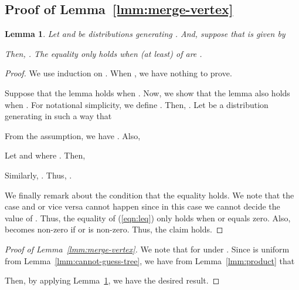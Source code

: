 \documentclass[letterpaper,11pt]{article}
\newtheorem{lemma}[theorem]{Lemma}
\begin{document}
\subsection{Proof of Lemma~\ref{lmm:merge-vertex}}\label{apx:merge-vertex}
\begin{lemma}\label{lmm:product-tv}
  Let  and  be distributions generating .
  And, suppose that  is given by
  
  Then, .
  The equality only holds when (at least)  of  are .
\end{lemma}
\begin{proof}
  We use induction on .
  When , we have nothing to prove.

  Suppose that the lemma holds when .
  Now, we show that the lemma also holds when .
  For notational simplicity,
  we define .
  Then, .
  Let  be a distribution generating  in such a way that
  
  From the assumption, we have .
  Also,
  
  Let  and  where .
  Then, 
  
  Similarly, .
  Thus, 
  .
  
  We finally remark about the condition that the equality holds.
  We note that the case  and  or vice versa cannot happen since in this case we cannot decide the value of .
  Thus, the equality of (\ref{eqn:leq}) only holds when  or  equals zero.
  Also,  becomes non-zero if  or  is non-zero.
  Thus, the claim holds.
\end{proof}

\begin{proof}[Proof of Lemma~\ref{lmm:merge-vertex}]
  We note that  for  under .
  Since  is uniform from Lemma~\ref{lmm:cannot-guess-tree},
  we have from Lemma~\ref{lmm:product} that
  
  Then, by applying Lemma~\ref{lmm:product-tv}, we have the desired result.
\end{proof}
\end{document}
